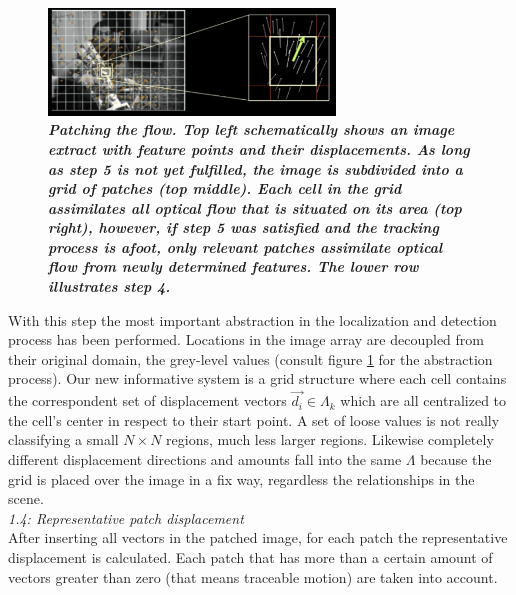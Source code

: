 \documentclass[conference]{IEEEtran}
\begin{document}
\begin{figure}
	\begin{center}
		\includegraphics[width=3in]{imgs/method/step1to4.pdf}
		\caption[Patching the flow. ]{\textbf{\textit{Patching the flow. Top left schematically shows an image extract with feature points and their displacements. As long as step 5 is not yet fulfilled, the image is subdivided into a grid of patches (top middle). Each cell in the grid assimilates all optical flow that is situated on its area (top right), however, if step 5 was satisfied and the tracking process is afoot, only relevant patches assimilate optical flow from newly determined features. The lower row illustrates step 4. }}}
		\label{fig:abstraction}
	\end{center}
\end{figure}
%
With this step the most important abstraction in the localization and detection process has been performed. Locations in the image array are decoupled from their original domain, the grey-level values (consult figure \ref{fig:abstraction} for the abstraction process). Our new informative system is a grid structure where each cell contains the correspondent set of displacement vectors $ \vec{d_i} \in \Lambda_k $ which are all centralized to the cell's center in respect to their start point. A set of loose values is not really classifying a small $ N \times N $ regions, much less larger regions. Likewise completely different displacement directions and amounts fall into the same $ \Lambda $ because the grid is placed over the image in a fix way, regardless the relationships in the scene.\\ \newline
%
\textit{1.4: Representative patch displacement} \\ \newline
After inserting all vectors in the patched image, for each patch the representative displacement is calculated. Each patch that has more than a certain amount of vectors greater than zero (that means traceable motion) are taken into account.
\end{document}
